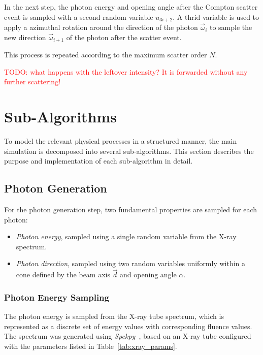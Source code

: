 In the next step, the photon energy and opening angle after the Compton scatter
event is sampled with a second random variable $u_{3i+2}$. A thrid variable is
used to apply a azimuthal rotation around the direction of the photon
$\vec{\omega}_i$ to sample the new direction $\vec{\omega}_{i+1}$ of the photon
after the scatter event.

This process is repeated according to the maximum scatter order $N$.

\textcolor{red}{TODO: what happens with the leftover intensity? It is forwarded without any further scattering!}

\section{Sub-Algorithms}
\label{sec:subAlgorithms}

To model the relevant physical processes in a structured manner, the main
simulation is decomposed into several sub-algorithms. This section describes the
purpose and implementation of each sub-algorithm in detail.

\subsection{Photon Generation}
For the photon generation step, two fundamental properties are sampled for each
photon:

\begin{itemize}
    \item \emph{Photon energy}, sampled using a single random variable from the
    X-ray spectrum.
    \item \emph{Photon direction}, sampled using two random variables uniformly
    within a cone defined by the beam axis $\vec{d}$ and opening angle $\alpha$.
\end{itemize}

\subsubsection{Photon Energy Sampling}

The photon energy is sampled from the X-ray tube spectrum, which is represented
as a discrete set of energy values with corresponding fluence values. The
spectrum was generated using \emph{Spekpy}~\cite{spekpy,poludniowski2021spekpy},
based on an X-ray tube configured with the parameters listed in
Table~\ref{tab:xray_params}.

